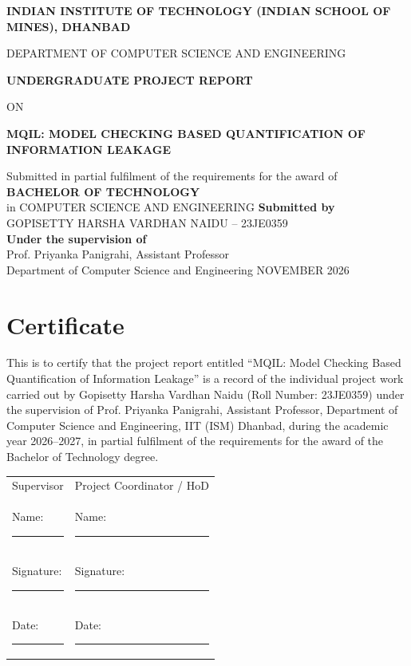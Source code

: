 \documentclass[12pt,a4paper,oneside]{report}
\begin{document}
\begin{titlepage}
\centering
{\Large\bfseries INDIAN INSTITUTE OF TECHNOLOGY (INDIAN SCHOOL OF MINES), DHANBAD\par}
\vspace{0.5cm}
{\large DEPARTMENT OF COMPUTER SCIENCE AND ENGINEERING\par}
\vspace{1.8cm}
{\Large\bfseries UNDERGRADUATE PROJECT REPORT\par}
\vspace{0.3cm}
{\large ON\par}
\vspace{0.5cm}
{\LARGE\bfseries MQIL: MODEL CHECKING BASED QUANTIFICATION OF INFORMATION LEAKAGE\par}
\vspace{1.4cm}
Submitted in partial fulfilment of the requirements for the award of\\[0.2cm]
{\Large\bfseries BACHELOR OF TECHNOLOGY}\\
in COMPUTER SCIENCE AND ENGINEERING
\vfill
{\large\bfseries Submitted by}\\[0.2cm]
GOPISETTY HARSHA VARDHAN NAIDU -- 23JE0359\\[0.8cm]
{\large\bfseries Under the supervision of}\\[0.2cm]
Prof. Priyanka Panigrahi, Assistant Professor\\
Department of Computer Science and Engineering
\vfill
{\large NOVEMBER 2026}
\end{titlepage}

\chapter*{Certificate}
This is to certify that the project report entitled ``MQIL: Model Checking Based Quantification of Information Leakage'' is a record of the individual project work carried out by Gopisetty Harsha Vardhan Naidu (Roll Number: 23JE0359) under the supervision of Prof. Priyanka Panigrahi, Assistant Professor, Department of Computer Science and Engineering, IIT (ISM) Dhanbad, during the academic year 2026--2027, in partial fulfilment of the requirements for the award of the Bachelor of Technology degree.

\vspace{1cm}
\noindent\begin{tabular}{p{}p{}}
Supervisor & Project Coordinator / HoD\\[1cm]
Name: \rule{4cm}{0.4pt} & Name: \rule{4cm}{0.4pt}\\[0.8cm]
Signature: \rule{3.5cm}{0.4pt} & Signature: \rule{3.5cm}{0.4pt}\\[0.8cm]
Date: \rule{4cm}{0.4pt} & Date: \rule{4cm}{0.4pt}
\end{tabular}
\end{document}

